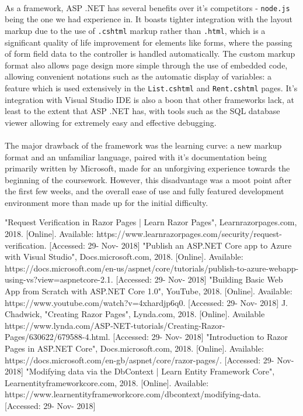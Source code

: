 \documentclass{article}
\begin{document}
    \paragraph{}
        As a framework, ASP .NET has several benefits over it's competitors - \texttt{node.js} being the one we had experience in.
        It boasts tighter integration with the layout markup due to the use of \texttt{.cshtml} markup rather than \texttt{.html}, which is a significant quality of life improvement for elements like forms, where the passing of form field data to the controller is handled automatically.
        The custom markup format also allows page design more simple through the use of embedded code, allowing convenient notations such as the automatic display of variables: a feature which is used extensively in the \texttt{List.cshtml} and \texttt{Rent.cshtml} pages.
        It's integration with Visual Studio IDE is also a boon that other frameworks lack, at least to the extent that ASP .NET has, with tools such as the SQL database viewer allowing for extremely easy and effective debugging.

    \paragraph{}
        The major drawback of the framework was the learning curve: a new markup format and an unfamiliar language, paired with it's documentation being primarily written by Microsoft, made for an unforgiving experience towards the beginning of the coursework.
        However, this disadvantage was a moot point after the first few weeks, and the overall ease of use and fully featured development environment more than made up for the initial difficulty.

\newpage
\begin{thebibliography}{1}
        "Request Verification in Razor Pages | Learn Razor Pages", Learnrazorpages.com, 2018. [Online]. Available: https://www.learnrazorpages.com/security/request-verification. [Accessed: 29- Nov- 2018]
        "Publish an ASP.NET Core app to Azure with Visual Studio", Docs.microsoft.com, 2018. [Online]. Available: https://docs.microsoft.com/en-us/aspnet/core/tutorials/publish-to-azure-webapp-using-vs?view=aspnetcore-2.1. [Accessed: 29- Nov- 2018]
        "Building Basic Web App from Scratch with ASP.NET Core 1.0", YouTube, 2018. [Online]. Available: https://www.youtube.com/watch?v=4xhardjp6q0. [Accessed: 29- Nov- 2018]
        J. Chadwick, "Creating Razor Pages", Lynda.com, 2018. [Online]. Available https://www.lynda.com/ASP-NET-tutorials/Creating-Razor-Pages/630622/679588-4.html. [Accessed: 29- Nov- 2018]
        "Introduction to Razor Pages in ASP.NET Core", Docs.microsoft.com, 2018. [Online]. Available: https://docs.microsoft.com/en-gb/aspnet/core/razor-pages/. [Accessed: 29- Nov- 2018]
        "Modifying data via the DbContext | Learn Entity Framework Core", Learnentityframeworkcore.com, 2018. [Online]. Available: https://www.learnentityframeworkcore.com/dbcontext/modifying-data. [Accessed: 29- Nov- 2018]
\end{thebibliography}
\end{document}
